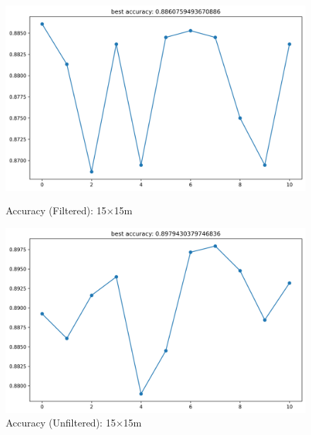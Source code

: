 \documentclass[runningheads]{llncs}
\begin{document}
\begin{figure}[H]
	\centering
	\begin{minipage}{0.49\textwidth}
		\centering
		\includegraphics[width=\textwidth]{figures/filtered/mlp_acc_15.png}
		\caption*{Accuracy (Filtered): 15×15m}
	\end{minipage}
	\hfill
	\begin{minipage}{0.49\textwidth}
		\centering
		\includegraphics[width=\textwidth]{figures/unfiltered/mlp_acc_15.png}
		\caption*{Accuracy (Unfiltered): 15×15m}
	\end{minipage}
\end{figure}
\end{document}
